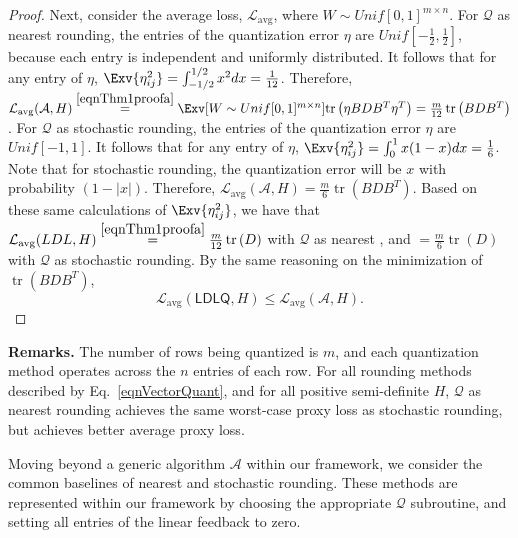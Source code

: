 \begin{proof}
Next, consider the average loss, $\mathcal{L}_{\operatorname{avg}}$, where $W \sim Unif[0,1]^{m \times n}$. For $\mathcal{Q}$ as nearest rounding, the entries of the quantization error $\eta$ are $Unif[-\frac 12, \frac 12]$, because each entry is independent and uniformly distributed. It follows that for any entry of $\eta$, $\Exv{ \eta_{ij}^2 } = \int_{-1/2}^{1/2} x^2 dx = \frac{1}{12}$.
Therefore,
$
    \mathcal{L}_{\operatorname{avg}}(\mathcal{A}, H)
    \stackrel{\eqref{eqnThm1proofa}}{=}
    \Exv[{W \sim Unif[0,1]^{m \times n}}]{\operatorname{tr}\left( \eta B D B^T \eta^T \right) } =
    \frac{m}{12} \operatorname{tr}\left( B D B^T \right)
$.
For $\mathcal{Q}$ as stochastic rounding, the entries of the quantization error $\eta$ are $Unif[-1,1]$. It follows that for any entry of $\eta$, $\Exv{ \eta_{ij}^2 } = \int_0^1 x (1-x) dx = \frac16$.
Note that for stochastic rounding, the quantization error will be $x$ with probability $(1-|x|)$. Therefore, $
    \mathcal{L}_{\operatorname{avg}}(\mathcal{A}, H) = 
    \frac m6 \operatorname{tr}\left( B D B^T \right)
$. 
Based on these same calculations of $\Exv{ \eta_{ij}^2 }$, we have that $\mathcal{L}_{\operatorname{avg}}(LDL, H) \stackrel{\eqref{eqnThm1proofa}}{=} \frac{m}{12} \operatorname{tr}\left( D \right)$ with $\mathcal{Q}$ as nearest , and $= \frac m6 \operatorname{tr}\left( D \right)$ with $\mathcal{Q}$ as stochastic rounding. By the same reasoning on the minimization of $\operatorname{tr}\left( B D B^T \right)$,
\[
    \mathcal{L}_{\operatorname{avg}}(\mathsf{LDLQ}, H) \leq
    \mathcal{L}_{\operatorname{avg}}(\mathcal{A}, H).
\]

\end{proof}

\textbf{Remarks.}
The number of rows being quantized is $m$, and each quantization method operates across the $n$ entries of each row. For all rounding methods described by Eq.~\eqref{eqnVectorQuant}, and for all positive semi-definite $H$, $\mathcal{Q}$ as nearest rounding achieves the same worst-case proxy loss as stochastic rounding, but achieves better average proxy loss.

Moving beyond a generic algorithm $\mathcal{A}$ within our framework, we consider the common baselines of nearest and stochastic rounding. These methods are represented within our framework by choosing the appropriate $\mathcal{Q}$ subroutine, and setting all entries of the linear feedback to zero.

